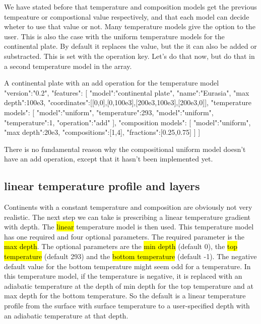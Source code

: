 \documentclass{book}
\begin{document}
We have stated before that temperature and composition models get the previous tempeature or compostional value respectively, and that each model can decide wheter to use that value or not. Many temperature models give the option to the user. This is also the case with the uniform temperature models for the continental plate. By default it replaces the value, but the it can also be added or substracted. This is set with the operation key. Let's do that now, but do that in a second temperature model in the array.

\begin{javascriptcode}{A continental plate with an add operation for the temperature model}{}
{
  "version":"0.2",
  "features":
  [
    {
      "model":"continental plate", "name":"Eurasia", "max depth":100e3,
      "coordinates":[[0,0],[0,100e3],[200e3,100e3],[200e3,0]],
      "temperature models":
      [
        {"model":"uniform", "temperature":293},
        {"model":"uniform", "temperature":1, "operation":"add"}
      ],
      "composition models":
      [
        {
          "model":"uniform", "max depth":20e3, "compositions":[1,4], 
          "fractions":[0.25,0.75]
        }
      ]
    }
  ]
}
\end{javascriptcode}

\begin{remark}
There is no fundamental reason why the compositional uniform model doesn't have an add operation, except that it hasn't been implemented yet.
\end{remark}

\subsection{linear temperature profile and layers}
Continents with a constant temperature and composition are obviously not very realistic. The next step we can take is prescribing a linear temperature gradient with depth. The \hl{linear} temperature model is then used. This temperature model has one required and four optional parameters. The required parameter is the \hl{max depth}. The optional parameters are the \hl{min depth} (default 0), the \hl{top temperature} (default 293) and the \hl{bottom temperature} (default -1). The negative default value for the bottom temperature might seem odd for a temperature. In this temperature model, if the temperature is negative, it is replaced with an adiabatic temperature at the depth of min depth for the top temperature and at max depth for the bottom temperature. So the default is a linear temperature profile from the surface with surface temperature to a user-specified depth with an adiabatic temperature at that depth.
\end{document}
